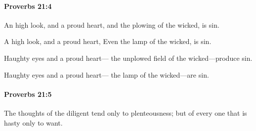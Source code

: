 		\paragraph{Proverbs 21:4} %
			\label{PROVERBS-21-4}

			An high look, and a proud heart, and the plowing of the wicked, is sin.

			\begin{versebox}
					\item[BHS] 
					\item[ASV] A high look, and a proud heart, Even the lamp of the wicked, is sin.
					\item[NIV] Haughty eyes and a proud heart— the unplowed field of the wicked—produce sin.
					\item[NRSV] Haughty eyes and a proud heart— the lamp of the wicked—are sin.
			\end{versebox}

		\paragraph{Proverbs 21:5} %
			\label{PROVERBS-21-5}

			The thoughts of the diligent tend only to plenteousness; but of every one that is hasty only to want.

